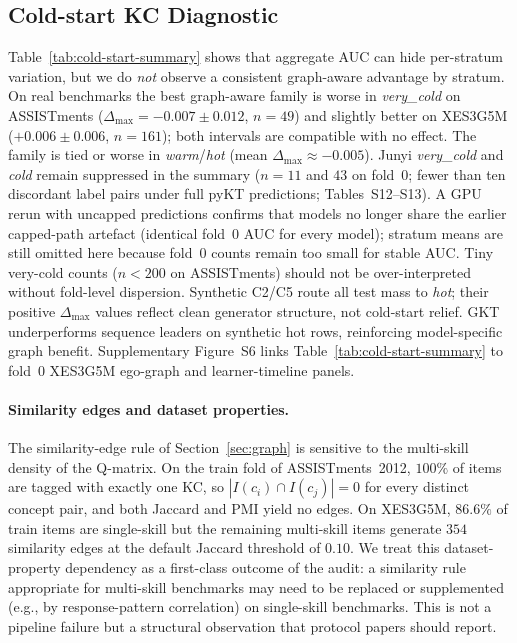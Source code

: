 \documentclass[preprint,10pt,doubleblind]{elsarticle}
\begin{document}
\subsection{Cold-start KC Diagnostic}
\label{sec:exp-coldstart}

Table~\ref{tab:cold-start-summary} shows that aggregate AUC can hide
per-stratum variation, but we do \emph{not} observe a consistent
graph-aware advantage by stratum. On real benchmarks the best graph-aware
family is worse in \emph{very\_cold} on ASSISTments
($\Delta_{\max}{=}{-}0.007{\pm}0.012$, $n{=}49$) and slightly better on
XES3G5M ($+0.006{\pm}0.006$, $n{=}161$); both intervals are compatible
with no effect. The family is tied or worse in \emph{warm}/\emph{hot}
(mean $\Delta_{\max}{\approx}{-}0.005$). Junyi \emph{very\_cold} and \emph{cold}
remain suppressed in the summary ($n{=}11$ and $43$ on fold~0; fewer than ten
discordant label pairs under full pyKT predictions; Tables~S12--S13). A
GPU rerun with uncapped predictions confirms that models no longer share
the earlier capped-path artefact (identical fold~0 AUC for every
model); stratum means are still omitted here because fold~0 counts remain too
small for stable AUC. Tiny very-cold counts
($n{<}200$ on ASSISTments) should not be over-interpreted without
fold-level dispersion. Synthetic C2/C5 route
all test mass to \emph{hot}; their positive $\Delta_{\max}$ values
reflect clean generator structure, not cold-start relief. GKT underperforms
sequence leaders on synthetic hot rows, reinforcing model-specific graph benefit.
Supplementary Figure~S6 links
Table~\ref{tab:cold-start-summary} to fold~0 XES3G5M ego-graph and
learner-timeline panels.

\paragraph{Similarity edges and dataset properties.}
The similarity-edge rule of Section~\ref{sec:graph} is sensitive to the
multi-skill density of the Q-matrix. On the train fold of
ASSISTments~2012, $100\%$ of items are tagged with exactly one KC, so
$|I(c_i) \cap I(c_j)| = 0$ for every distinct concept pair, and both
Jaccard and PMI yield no edges. On XES3G5M, $86.6\%$ of train items are
single-skill but the remaining multi-skill items generate $354$
similarity edges at the default Jaccard threshold of $0.10$. We treat
this dataset-property dependency as a first-class outcome of the audit:
a similarity rule appropriate for multi-skill benchmarks may need to be
replaced or supplemented (e.g., by response-pattern correlation) on
single-skill benchmarks. This is not a pipeline failure but a structural
observation that protocol papers should report.
\end{document}
